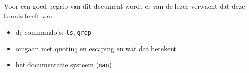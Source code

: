 Voor een goed begrip van dit document wordt er van de lezer verwacht dat deze kennis heeft van:
\begin{itemize}
\item de commando's: \texttt{ls}, \texttt{grep}
\item omgaan met quoting en escaping en wat dat betekent
\item het documentatie systeem (\texttt{man}) 
\end{itemize}
